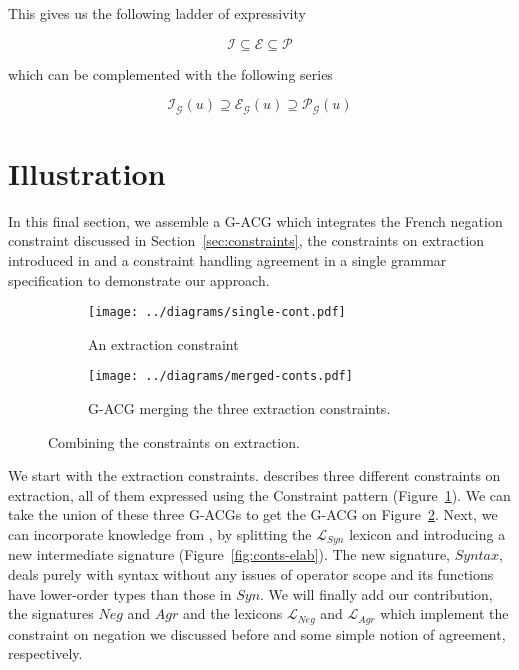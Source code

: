 \documentclass{llncs}
\begin{document}
This gives us the following ladder of expressivity

$$
\mathcal{I} \subseteq \mathcal{E} \subseteq \mathcal{P}
$$

which can be complemented with the following series

$$
\mathcal{I}_{\mathcal{G}}(u) \supseteq \mathcal{E}_{\mathcal{G}}(u) \supseteq
\mathcal{P}_{\mathcal{G}}(u)
$$


\section{Illustration}

In this final section, we assemble a G-ACG which integrates the French
negation constraint discussed in Section~\ref{sec:constraints}, the
constraints on extraction introduced in \cite{pogodalla2012controlling} and a
constraint handling agreement in a single grammar specification to demonstrate
our approach.

\begin{figure}[t]
  \centering
  \begin{subfigure}[b]{0.4\textwidth}
    \centering
    \texttt{[image: ../diagrams/single-cont.pdf]}
    \caption{\label{fig:single-cont} An extraction constraint }
  \end{subfigure}
  \qquad
  \begin{subfigure}[b]{0.4\textwidth}
    \centering
    \texttt{[image: ../diagrams/merged-conts.pdf]}
    \caption{\label{fig:merged-conts} G-ACG merging the three extraction
      constraints.}
  \end{subfigure}
  \caption{\label{fig:conts} Combining the constraints on extraction.}
\end{figure}

We start with the extraction constraints. \cite{pogodalla2012controlling}
describes three different constraints on extraction, all of them expressed
using the Constraint pattern (Figure~\ref{fig:single-cont}). We can take the
union of these three G-ACGs to get the G-ACG on Figure~\ref{fig:merged-conts}.
Next, we can incorporate knowledge from \cite{pogodalla2007generalizing}, by
splitting the $\mathcal{L}_{Syn}$ lexicon and introducing a new intermediate
signature (Figure~\ref{fig:conts-elab}). The new signature, $Syntax$, deals
purely with syntax without any issues of operator scope and its functions have
lower-order types than those in $Syn$. We will finally add our contribution,
the signatures $Neg$ and $Agr$ and the lexicons $\mathcal{L}_{Neg}$ and
$\mathcal{L}_{Agr}$ which implement the constraint on negation we discussed
before and some simple notion of agreement, respectively.
\end{document}
